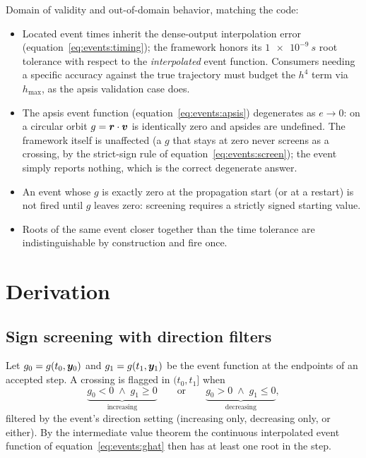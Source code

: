 Domain of validity and out-of-domain behavior, matching the code:
\begin{itemize}
  \item Located event times inherit the dense-output interpolation error
    (equation~\eqref{eq:events:timing}); the framework honors its
    $\qty{1e-9}{s}$ root tolerance with respect to the \emph{interpolated}
    event function. Consumers needing a specific accuracy against the true
    trajectory must budget the $h^{4}$ term via $h_{\max}$, as the apsis
    validation case does.
  \item The apsis event function (equation~\eqref{eq:events:apsis})
    degenerates as $e \to 0$: on a circular orbit $g = \bm{r}\cdot\bm{v}$
    is identically zero and apsides are undefined. The framework itself is
    unaffected (a $g$ that stays at zero never screens as a crossing, by
    the strict-sign rule of equation~\eqref{eq:events:screen}); the event
    simply reports nothing, which is the correct degenerate answer.
  \item An event whose $g$ is exactly zero at the propagation start (or at
    a restart) is not fired until $g$ leaves zero: screening requires a
    strictly signed starting value.
  \item Roots of the same event closer together than the time tolerance are
    indistinguishable by construction and fire once.
\end{itemize}

\section{Derivation}
\label{sec:events:derivation}

\subsection{Sign screening with direction filters}

Let $g_0 = g(t_0, \bm{y}_0)$ and $g_1 = g(t_1, \bm{y}_1)$ be the event
function at the endpoints of an accepted step. A crossing is flagged in
$(t_0, t_1]$ when
\begin{equation}
  \underbrace{g_0 < 0 \;\wedge\; g_1 \ge 0}_{\text{increasing}}
  \qquad\text{or}\qquad
  \underbrace{g_0 > 0 \;\wedge\; g_1 \le 0}_{\text{decreasing}},
  \label{eq:events:screen}
\end{equation}
filtered by the event's direction setting (increasing only, decreasing
only, or either). By the intermediate value theorem the continuous
interpolated event function of
equation~\eqref{eq:events:ghat} then has at least one root in the step.

